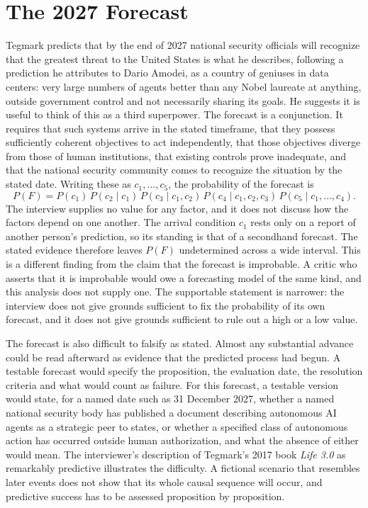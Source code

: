 \documentclass[11pt]{article}
\begin{document}
\section{The 2027 Forecast}

Tegmark predicts that by the end of 2027 national security officials will recognize that the greatest threat to the United States is what he describes, following a prediction he attributes to Dario Amodei, as a country of geniuses in data centers: very large numbers of agents better than any Nobel laureate at anything, outside government control and not necessarily sharing its goals. He suggests it is useful to think of this as a third superpower. The forecast is a conjunction. It requires that such systems arrive in the stated timeframe, that they possess sufficiently coherent objectives to act independently, that those objectives diverge from those of human institutions, that existing controls prove inadequate, and that the national security community comes to recognize the situation by the stated date. Writing these as $c_1,\dots,c_5$, the probability of the forecast is
\[
P(F)=P(c_1)\,P(c_2\mid c_1)\,P(c_3\mid c_1,c_2)\,P(c_4\mid c_1,c_2,c_3)\,P(c_5\mid c_1,\dots,c_4).
\]
The interview supplies no value for any factor, and it does not discuss how the factors depend on one another. The arrival condition $c_1$ rests only on a report of another person's prediction, so its standing is that of a secondhand forecast. The stated evidence therefore leaves $P(F)$ undetermined across a wide interval. This is a different finding from the claim that the forecast is improbable. A critic who asserts that it is improbable would owe a forecasting model of the same kind, and this analysis does not supply one. The supportable statement is narrower: the interview does not give grounds sufficient to fix the probability of its own forecast, and it does not give grounds sufficient to rule out a high or a low value.

The forecast is also difficult to falsify as stated. Almost any substantial advance could be read afterward as evidence that the predicted process had begun. A testable forecast would specify the proposition, the evaluation date, the resolution criteria and what would count as failure. For this forecast, a testable version would state, for a named date such as 31 December 2027, whether a named national security body has published a document describing autonomous AI agents as a strategic peer to states, or whether a specified class of autonomous action has occurred outside human authorization, and what the absence of either would mean. The interviewer's description of Tegmark's 2017 book \emph{Life 3.0} \cite{Tegmark2017} as remarkably predictive illustrates the difficulty. A fictional scenario that resembles later events does not show that its whole causal sequence will occur, and predictive success has to be assessed proposition by proposition.
\end{document}
